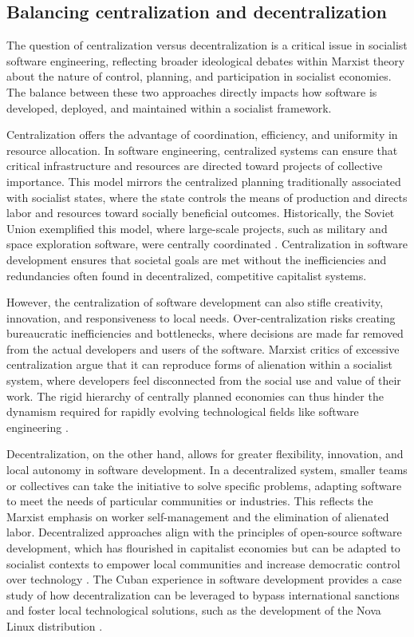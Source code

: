 \begin{refsection}
\subsection{Balancing centralization and decentralization}

The question of centralization versus decentralization is a critical issue in socialist software engineering, reflecting broader ideological debates within Marxist theory about the nature of control, planning, and participation in socialist economies. The balance between these two approaches directly impacts how software is developed, deployed, and maintained within a socialist framework. 

Centralization offers the advantage of coordination, efficiency, and uniformity in resource allocation. In software engineering, centralized systems can ensure that critical infrastructure and resources are directed toward projects of collective importance. This model mirrors the centralized planning traditionally associated with socialist states, where the state controls the means of production and directs labor and resources toward socially beneficial outcomes. Historically, the Soviet Union exemplified this model, where large-scale projects, such as military and space exploration software, were centrally coordinated \cite[pp.~157-160]{holloway}. Centralization in software development ensures that societal goals are met without the inefficiencies and redundancies often found in decentralized, competitive capitalist systems.

However, the centralization of software development can also stifle creativity, innovation, and responsiveness to local needs. Over-centralization risks creating bureaucratic inefficiencies and bottlenecks, where decisions are made far removed from the actual developers and users of the software. Marxist critics of excessive centralization argue that it can reproduce forms of alienation within a socialist system, where developers feel disconnected from the social use and value of their work. The rigid hierarchy of centrally planned economies can thus hinder the dynamism required for rapidly evolving technological fields like software engineering \cite[pp.~79-82]{kornai}.

Decentralization, on the other hand, allows for greater flexibility, innovation, and local autonomy in software development. In a decentralized system, smaller teams or collectives can take the initiative to solve specific problems, adapting software to meet the needs of particular communities or industries. This reflects the Marxist emphasis on worker self-management and the elimination of alienated labor. Decentralized approaches align with the principles of open-source software development, which has flourished in capitalist economies but can be adapted to socialist contexts to empower local communities and increase democratic control over technology \cite[pp.~102-104]{raymond}. The Cuban experience in software development provides a case study of how decentralization can be leveraged to bypass international sanctions and foster local technological solutions, such as the development of the Nova Linux distribution \cite[pp.~63-67]{ernesto}.


\end{refsection}
